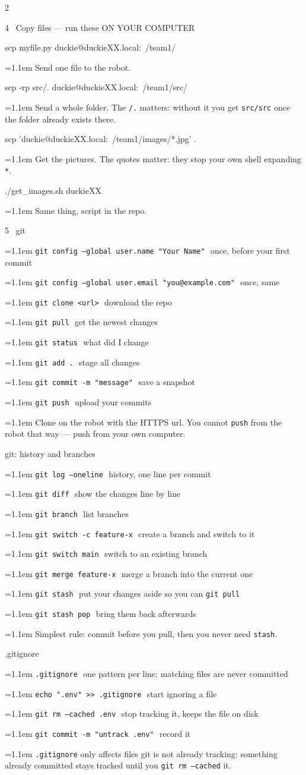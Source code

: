 \documentclass[10pt,a4paper]{extarticle}
\newcommand{\code}[1]{\textcolor{accentd}{\texttt{#1}}}
\newcommand{\ce}[2]{\par\hangindent=1.1em\hangafter=1
  \code{#1}\,\textcolor{dim}{\small\textemdash\ #2}\par\vspace{0.5pt}}
\newcommand{\nt}[1]{\par\hangindent=1.1em\hangafter=1
  \textcolor{dim}{\small #1}\par\vspace{0.5pt}}
\begin{document}
\begin{multicols}{2}
\begin{sect}{4 \ Copy files --- run these ON YOUR COMPUTER}
\begin{cmd}
scp myfile.py duckie@duckieXX.local:~/team1/
\end{cmd}
\nt{Send one file to the robot.}
\begin{cmd}
scp -rp src/. duckie@duckieXX.local:~/team1/src/
\end{cmd}
\nt{Send a whole folder. The \code{/.} matters: without it you get \code{src/src} once the folder already exists there.}
\begin{cmd}
scp 'duckie@duckieXX.local:~/team1/images/*.jpg' .
\end{cmd}
\nt{Get the pictures. The quotes matter: they stop your own shell expanding \code{*}.}
\begin{cmd}
./get_images.sh duckieXX
\end{cmd}
\nt{Same thing, script in the repo.}
\end{sect}

\begin{sect}{5 \ git}
\ce{git config --global user.name "Your Name"}{once, before your first commit}
\ce{git config --global user.email "you@example.com"}{once, same}
\ce{git clone <url>}{download the repo}
\ce{git pull}{get the newest changes}
\ce{git status}{what did I change}
\ce{git add .}{stage all changes}
\ce{git commit -m "message"}{save a snapshot}
\ce{git push}{upload your commits}
\nt{Clone on the robot with the HTTPS url. You cannot \code{push} from the robot that way --- push from your own computer.}
\end{sect}

\begin{sect}{git: history and branches}
\ce{git log --oneline}{history, one line per commit}
\ce{git diff}{show the changes line by line}
\ce{git branch}{list branches}
\ce{git switch -c feature-x}{create a branch and switch to it}
\ce{git switch main}{switch to an existing branch}
\ce{git merge feature-x}{merge a branch into the current one}
\ce{git stash}{put your changes aside so you can \code{git pull}}
\ce{git stash pop}{bring them back afterwards}
\nt{Simplest rule: commit before you pull, then you never need \code{stash}.}
\end{sect}

\begin{sect}{.gitignore}
\ce{.gitignore}{one pattern per line; matching files are never committed}
\ce{echo ".env" >> .gitignore}{start ignoring a file}
\ce{git rm --cached .env}{stop tracking it, keeps the file on disk}
\ce{git commit -m "untrack .env"}{record it}
\nt{\code{.gitignore} only affects files git is not already tracking: something already committed stays tracked until you \code{git rm --cached} it.}
\end{sect}


\end{multicols}
\end{document}
